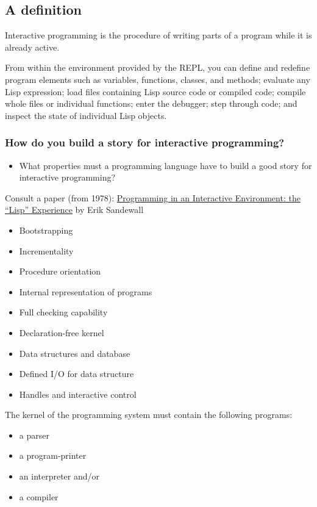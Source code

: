 \documentclass[11pt]{article}
\begin{document}
\subsection*{A definition}
\label{sec:orgheadline11}

Interactive programming is the procedure of writing parts of a program while it is already active.

From within the environment provided by the REPL, you can define and redefine program elements such as variables, functions, classes, and methods; evaluate any Lisp expression; load files containing Lisp source code or compiled code; compile whole files or individual functions; enter the debugger; step through code; and inspect the state of individual Lisp objects.

\subsubsection*{How do you build a story for interactive programming?}
\label{sec:orgheadline10}
\begin{itemize}
\item What properties must a programming language have to build a good story for interactive programming?
\end{itemize}

Consult a paper (from 1978): \href{http://www.ida.liu.se/ext/caisor/archive/1978/001/caisor-1978-001.pdf}{Programming in an Interactive Environment: the ``Lisp'' Experience} by Erik Sandewall
\begin{itemize}
\item Bootstrapping
\item Incrementality
\item Procedure orientation
\item Internal representation of programs
\item Full checking capability
\item Declaration-free kernel
\item Data structures and database
\item Defined I/O for data structure
\item Handles and interactive control
\end{itemize}

The kernel of the programming system must contain the following programs:

\begin{itemize}
\item a parser
\item a program-printer
\item an interpreter and/or
\item a compiler
\end{itemize}
\end{document}
